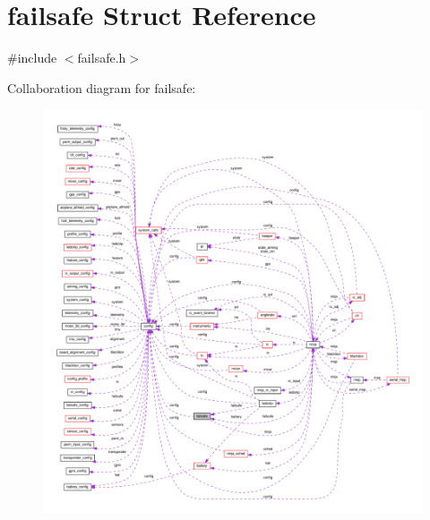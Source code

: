 \hypertarget{structfailsafe}{\section{failsafe Struct Reference}
\label{structfailsafe}
}


{\ttfamily \#include $<$failsafe.\+h$>$}



Collaboration diagram for failsafe\+:
\nopagebreak
\begin{figure}[H]
\begin{center}
\leavevmode
\includegraphics[width=350pt]{structfailsafe__coll__graph}
\end{center}
\end{figure}

